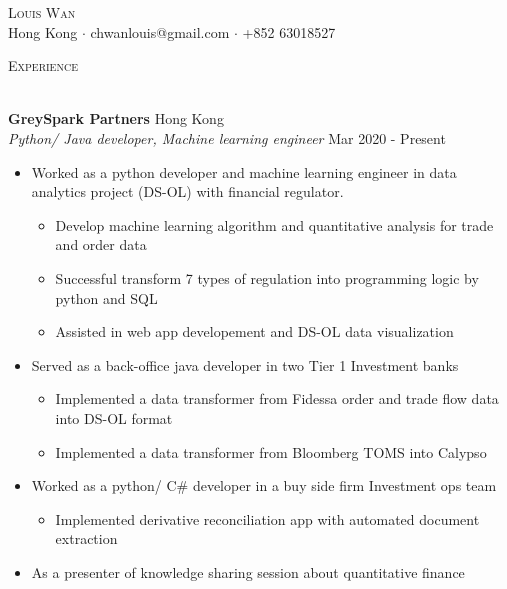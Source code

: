 \documentclass[a4paper]{article}
\newcommand{\lineunder} {
    \vspace*{-8pt} \\
    \hspace*{-18pt} \hrulefill \\
}
\newcommand{\header} [1] {
    {\hspace*{-18pt}\vspace*{6pt} \textsc{#1}}
    \vspace*{-6pt} \lineunder
}
\begin{document}
\vspace*{-40pt}

    

\vspace*{-10pt}
\begin{center}
	{\Huge \scshape {Louis Wan}}\\
	Hong Kong $\cdot$ chwanlouis@gmail.com $\cdot$ +852 63018527\\
\end{center}

\header{Experience}
\vspace{1mm}

\textbf{GreySpark Partners} \hfill Hong Kong\\
\textit{Python/ Java developer, Machine learning engineer} \hfill Mar 2020 - Present\\
\vspace{-1mm}
\begin{itemize} \itemsep 1pt
	\item Worked as a python developer and machine learning engineer in data analytics project (DS-OL) with financial regulator.
        \begin{itemize}
            \item Develop machine learning algorithm and quantitative analysis for trade and order data
            \item Successful transform 7 types of regulation into programming logic by python and SQL
            \item Assisted in web app developement and DS-OL data visualization
        \end{itemize}
	\item Served as a back-office java developer in two Tier 1 Investment banks
        \begin{itemize}
            \item Implemented a data transformer from Fidessa order and trade flow data into DS-OL format
            \item Implemented a data transformer from Bloomberg TOMS into Calypso
        \end{itemize}
	\item Worked as a python/ C\# developer in a buy side firm Investment ops team
        \begin{itemize}
            \item Implemented derivative reconciliation app with automated document extraction
        \end{itemize}
	\item As a presenter of knowledge sharing session about quantitative finance
\end{itemize}
\end{document}
